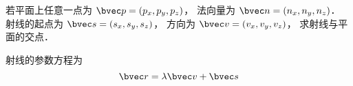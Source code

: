 
若平面上任意一点为 $\bvec p = (p_x, p_y, p_z)$， 法向量为 $\bvec n = (n_x, n_y, n_z)$． 射线的起点为 $\bvec s = (s_x, s_y, s_z)$， 方向为 $\bvec v = (v_x, v_y, v_z)$， 求射线与平面的交点．

射线的参数方程为
\begin{equation}
\bvec r = \lambda \bvec v + \bvec s
\end{equation}
